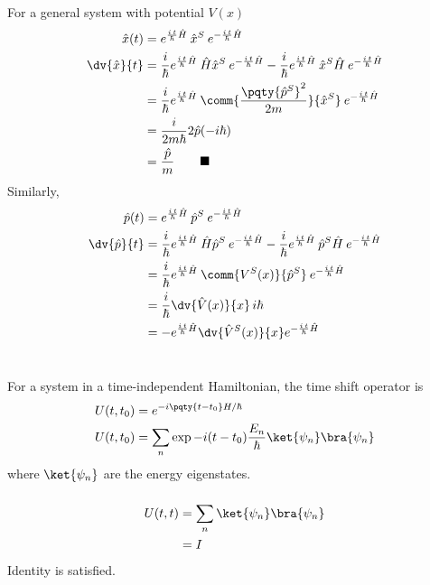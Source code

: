 \documentclass[12pt]{article}
\begin{document}
For a general system with potential $V(x)$
\begin{align*}
\hat{x}(t) &= e^{\frac{i\,t}{\hbar}\hat{H}}\: \hat{x}^S\:  e^{ -\frac{i\,t}{\hbar}\hat{H}}\\
\dv{\hat{x}}{t} &= \frac{i}{ \hbar}  e^{\frac{i\,t}{\hbar}\hat{H}}\: \hat{H}\hat{x}^S\: e^{ -\frac{i\,t}{\hbar}\hat{H}} - \frac{i}{ \hbar} e^{\frac{i\,t}{\hbar}\hat{H}}\:  \hat{x}^S \hat{H}\: e^{ -\frac{i\,t}{\hbar}\hat{H}}\\
&= \frac{i}{ \hbar} e^{\frac{i\,t}{\hbar}\hat{H}}\: \comm{\frac{\pqty{\hat{p}^S}^2 }{2m}}{\hat{x}^S}\: e^{ -\frac{i\,t}{\hbar}\hat{H}}\\
&= \frac{i}{2m \hbar} 2 \hat{p}( - i \hbar)\\
&= \frac{\hat{p}}{m}\qquad \blacksquare
\end{align*}
Similarly,
\begin{align*}
\hat{p}(t) &= e^{\frac{i\,t}{\hbar}\hat{H}}\: \hat{p}^S\:  e^{ -\frac{i\,t}{\hbar}\hat{H}}\\
\dv{\hat{p}}{t} &= \frac{i}{ \hbar}  e^{\frac{i\,t}{\hbar}\hat{H}}\: \hat{H}\hat{p}^S\: e^{ -\frac{i\,t}{\hbar}\hat{H}} - \frac{i}{ \hbar} e^{\frac{i\,t}{\hbar}\hat{H}}\:  \hat{p}^S \hat{H}\: e^{ -\frac{i\,t}{\hbar}\hat{H}}\\
&= \frac{i}{ \hbar} e^{\frac{i\,t}{\hbar}\hat{H}}\: \comm{V^S(x)}{\hat{p}^S}\: e^{ -\frac{i\,t}{\hbar}\hat{H}}\\
&= \frac{i}{\hbar} \dv{\hat{V}(x)}{x} \,  i \hbar\\
&= - e^{\frac{i\,t}{\hbar}\hat{H}}\dv{\hat{V}^S(x)}{x} e^{ -\frac{i\,t}{\hbar}\hat{H}}
\end{align*}
\newpage
\section{}
\subsection{} For a system in a time-independent Hamiltonian, the time shift operator is \begin{align*}
    U(t,t_0) &=  e^{ -i\pqty{t - t_0}H/\hbar}\\
    U(t,t_0) &=  \sum_n \exp{ - i(t - t_0)\frac{E_n}{\hbar}} \ket{\psi_n} \bra{\psi_n} 
\end{align*}
where \(\ket{\psi_n} \) are the energy eigenstates.
\subsubsection{} { \begin{align*}
    U(t,t) &=  \sum_n \ket{\psi_n} \bra{\psi_n} \\
    &= I
\end{align*}}
Identity is satisfied.
\end{document}
